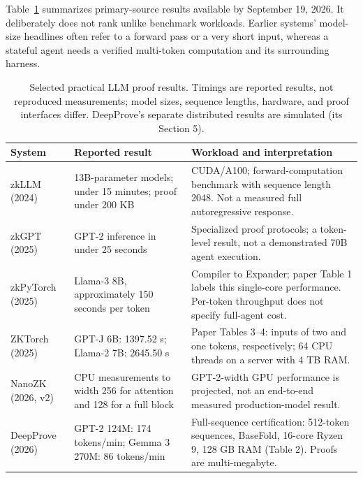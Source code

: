 \documentclass[10pt,letterpaper]{article}
\begin{document}
Table~\ref{tab:zk} summarizes primary-source results available by September 19, 2026. It deliberately does not rank unlike benchmark workloads. Earlier systems' model-size headlines often refer to a forward pass or a very short input, whereas a stateful agent needs a verified multi-token computation and its surrounding harness.

\begin{table}[t]
\centering\small
\setlength{\tabcolsep}{4pt}
\begin{tabularx}{\textwidth}{@{}>{\raggedright\arraybackslash}p{2.0cm}>{\raggedright\arraybackslash}p{3.1cm}>{\raggedright\arraybackslash}X@{}}
\toprule
System & Reported result & Workload and interpretation\\
\midrule
zkLLM (2024)~\citep{zkllm2024} & 13B-parameter models; under 15 minutes; proof under 200 KB & CUDA/A100; forward-computation benchmark with sequence length 2048. Not a measured full autoregressive response.\\[3pt]
zkGPT (2025)~\citep{zkgpt2025} & GPT-2 inference in under 25 seconds & Specialized proof protocols; a token-level result, not a demonstrated 70B agent execution.\\[3pt]
zkPyTorch (2025)~\citep{zkpytorch2025} & Llama-3 8B, approximately 150 seconds per token & Compiler to Expander; paper Table 1 labels this single-core performance. Per-token throughput does not specify full-agent cost.\\[3pt]
ZKTorch (2025)~\citep{zktorch2025} & GPT-J 6B: 1397.52 s; Llama-2 7B: 2645.50 s & Paper Tables 3--4: inputs of two and one tokens, respectively; 64 CPU threads on a server with 4 TB RAM.\\[3pt]
NanoZK (2026, v2)~\citep{nanozk2026} & CPU measurements to width 256 for attention and 128 for a full block & GPT-2-width GPU performance is projected, not an end-to-end measured production-model result.\\[3pt]
DeepProve (2026)~\citep{deepprove2026} & GPT-2 124M: 174 tokens/min; Gemma 3 270M: 86 tokens/min & Full-sequence certification: 512-token sequences, BaseFold, 16-core Ryzen 9, 128 GB RAM (Table 2). Proofs are multi-megabyte.\\
\bottomrule
\end{tabularx}
\caption{Selected practical LLM proof results. Timings are reported results, not reproduced measurements; model sizes, sequence lengths, hardware, and proof interfaces differ. DeepProve's separate distributed results are simulated (its Section 5).}
\label{tab:zk}
\end{table}
\end{document}
